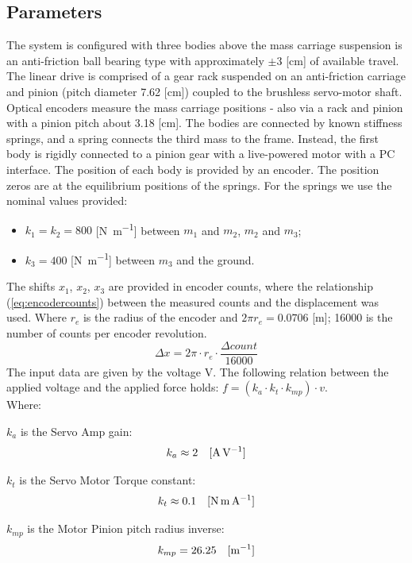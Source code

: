 \subsection{Parameters}
The system is configured with three bodies above the mass carriage suspension
is an anti-friction ball bearing type with approximately $\pm 3$
[\si{\centi\meter}] of available travel.
The linear drive is comprised of a gear rack suspended on an anti-friction
carriage and pinion (pitch diameter 7.62 [\si{\centi\meter}]) coupled to the
brushless servo-motor shaft.
Optical encoders measure the mass carriage positions - also via a rack and
pinion with a pinion pitch about 3.18 [\si{\centi\meter}].
The bodies are connected by known stiffness springs, and a spring connects the
third mass to the frame. Instead, the first body is rigidly connected to a
pinion gear with a live-powered motor with a PC interface.
The position of each body is provided by an encoder. The position zeros are at
the equilibrium positions of the springs.
For the springs we use the nominal values provided:
%
\begin{itemize}
	\item $k_1 = k_2 = 800$ [\si{\newton\per\meter}] between $m_1$ and $m_2$, $m_2$
and $m_3$;
	\item $k_3 = 400$ [\si{\newton\per\meter}] between $m_3$ and the ground.
\end{itemize}
%
The shifts $x_1$, $x_2$, $x_3$ are provided in encoder counts, where the
relationship (\ref{eq:encodercounts}) between the measured counts and the
displacement was used.
Where $r_{e}$ is the radius of the encoder and $2\pi r_{e} = 0.0706$
[\si{\meter}]; 16000 is the number of counts per encoder revolution.
%
\begin{equation}
	\Delta x = 2\pi \cdot r_{e} \cdot \frac{\Delta count}{16000}
	\label{eq:encodercounts}
\end{equation}
%
The input data are given by the voltage \si{\volt}.
The following relation between the applied voltage and the applied force holds:
$f = (k_a \cdot k_t \cdot k_{mp}) \cdot v$.\\
Where:\begin{description}
	\item $k_a$ is the Servo Amp gain:
	\begin{equation*}
		k_a \approx 2 \quad [\text{\si{\ampere\per\volt}}]
	\end{equation*}
	\item $k_t$ is the Servo Motor Torque constant:
	\begin{equation*}
		k_t	\approx	0.1 \quad 	[\text{\si{\newton\meter\per\ampere}}]
	\end{equation*}
	\item $k_{mp}$ is the Motor Pinion pitch radius inverse:
	\begin{equation*}
		k_{mp} 	= 26.25 \quad	[\text{\si{\per\meter}}]
	\end{equation*}
\end{description}

